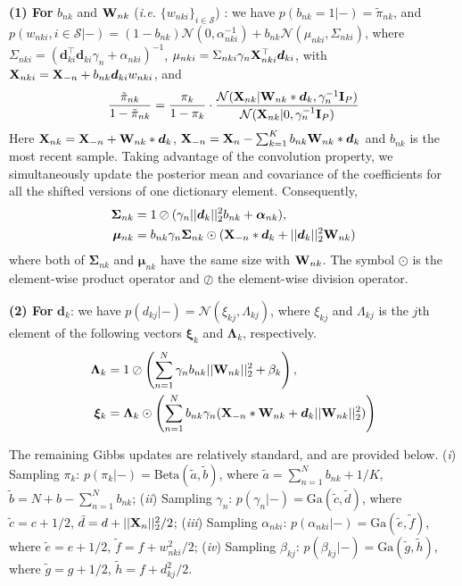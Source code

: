 \documentclass{article} %
\newcommand{\Imat}{{\bf I}}
\newcommand{\Wmat}[0]{{{\bf W}}}
\newcommand{\Xmat}[0]{{{\bf X}}}
\newcommand{\dv}{\boldsymbol{d}}
\newcommand{\Lambdamat}{\boldsymbol{\Lambda}}
\newcommand{\Sigmamat}[0]{{\boldsymbol{\Sigma}}}
\newcommand{\alphav}{\boldsymbol{\alpha}}
\newcommand{\muv}[0]{{\boldsymbol{\mu}}}
\newcommand{\xiv}[0]{{\boldsymbol{\xi}}}
\newcommand{\Ncal}{\mathcal{N}}
\newcommand{\Scal}{\mathcal{S}}
\begin{document}
\textbf{(1) For} $b_{nk}$ and $\Wmat_{nk}$ (\emph{i.e.} $\{w_{nki}\}_{i \in \Scal}$) : we have $p(b_{nk}=1|-) = \tilde{\pi}_{nk}$, and $p(w_{nki},i \in \Scal|-) = (1-b_{nk}) \Ncal(0,\alpha_{nki}^{-1}) + b_{nk} \Ncal (\mu_{nki},\Sigma_{nki})$, where $\Sigma_{nki} = (\dv_{ki}^\top \dv_{ki} \gamma_n + \alpha_{nki})^{-1}$, $\mu_{nki} = \Sigma_{nki} \gamma_n \Xmat_{nki}^\top \dv_{ki}$, with $\Xmat_{nki}= \Xmat_{-n} + b_{nk}\dv_{ki} w_{nki}$, and 
%
\begin{align}
\frac{\tilde{\pi}_{nk}}{1-\tilde{\pi}_{nk}} = \frac{\pi_k}{1-\pi_k} \cdot \frac{\Ncal (\Xmat_{nk}|\Wmat_{nk} \ast \dv_k, \gamma_n^{-1}\Imat_P)}{\Ncal (\Xmat_{nk}|0,\gamma_n^{-1}\Imat_P)}
\end{align}
%
Here $\Xmat_{nk}=\Xmat_{-n}+\Wmat_{nk} \ast \dv_k$, $\Xmat_{-n} = \Xmat_n - \sum_{k=1}^K b_{nk} \Wmat_{nk} \ast \dv_k$ and $b_{nk}$ is the most recent sample. Taking advantage of the convolution property, we simultaneously update the posterior mean and covariance of the coefficients for all the shifted versions of one dictionary element. Consequently, 
%
\begin{align}
\Sigmamat_{nk} &= 1 \oslash (\gamma_n ||\dv_k||_2^2 b_{nk} + \alphav_{nk}), \\
\muv_{nk} &= b_{nk} \gamma_n \Sigmamat_{nk} \odot (\Xmat_{-n} \ast \dv_k + ||\dv_k||_2^2 \Wmat_{nk})
\end{align}
%
where both of $\Sigmamat_{nk}$ and $\muv_{nk}$ have the same size with $\Wmat_{nk}$. The symbol $\odot$ is the element-wise product operator and $\oslash$ the element-wise division operator.

\textbf{(2) For} $\dv_k$: we have $p(d_{kj}|-) = \Ncal (\xi_{kj},\Lambda_{kj})$, where $\xi_{kj}$ and $\Lambda_{kj}$ is the $j$th element of the following vectors $\xiv_k$ and $\Lambdamat_k$, respectively.
%
\begin{align}
\Lambdamat_k &= 1 \oslash \left( \sum_{n=1}^N \gamma_n b_{nk} ||\Wmat_{nk}||_2^2 +\beta_k  \right), \\
\xiv_k &= \Lambdamat_k \odot \left( \sum_{n=1}^N b_{nk} \gamma_n (\Xmat_{-n} \ast \Wmat_{nk} + \dv_k ||\Wmat_{nk}||_2^2) \right)
\end{align} 

The remaining Gibbs updates are relatively standard, and are provided below. (\emph{i}) Sampling $\pi_k$: $p(\pi_k|-) = \mbox{Beta} (\tilde{a},\tilde{b})$, where $\tilde{a} = \sum_{n=1}^N b_{nk} + 1/K$, $\tilde{b} = N+b-\sum_{n=1}^N b_{nk}$; (\emph{ii}) Sampling $\gamma_n$: $p(\gamma_n|-) = \mbox{Ga} (\tilde{c},\tilde{d})$, where $\tilde{c} = c + 1/2$, $\tilde{d} = d + ||\Xmat_n||_2^2/2$; (\emph{iii}) Sampling $\alpha_{nki}$: $p(\alpha_{nki}|-) = \mbox{Ga} (\tilde{e},\tilde{f})$, where $\tilde{e} = e + 1/2$, $\tilde{f} = f + w_{nki}^2/2$; (\emph{iv}) Sampling $\beta_{kj}$: $p(\beta_{kj}|-) = \mbox{Ga} (\tilde{g},\tilde{h})$, where $\tilde{g} = g + 1/2$, $\tilde{h} = f + d_{kj}^2/2$.
\end{document}
